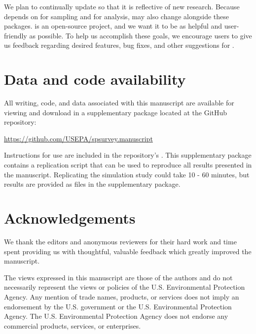 \documentclass[
  shortnames]{jss}
\begin{document}
We plan to continually update  so that it is reflective of
new research. Because  depends on  for sampling
and  \citep{lumley2020survey} for analysis, 
may also change alongside these packages.  is an
open-source project, and we want it to be as helpful and user-friendly
as possible. To help us accomplish these goals, we encourage users to
give us feedback regarding desired features, bug fixes, and other
suggestions for .

\hypertarget{data-and-code-availability}{%
\section*{Data and code availability}\label{data-and-code-availability}}

All writing, code, and data associated with this manuscript are
available for viewing and download in a supplementary 
package located at the GitHub repository:

\url{https://github.com/USEPA/spsurvey.manuscript}

Instructions for use are included in the repository's .
This supplementary  package contains a replication script
that can be used to reproduce all results presented in the manuscript.
Replicating the simulation study could take 10 - 60 minutes, but results
are provided as  files in the supplementary 
package.

\hypertarget{acknowledgements}{%
\section*{Acknowledgements}\label{acknowledgements}}

We thank the editors and anonymous reviewers for their hard work and
time spent providing us with thoughtful, valuable feedback which greatly
improved the manuscript.

The views expressed in this manuscript are those of the authors and do
not necessarily represent the views or policies of the U.S.
Environmental Protection Agency. Any mention of trade names, products,
or services does not imply an endorsement by the U.S. government or the
U.S. Environmental Protection Agency. The U.S. Environmental Protection
Agency does not endorse any commercial products, services, or
enterprises.


\end{document}
